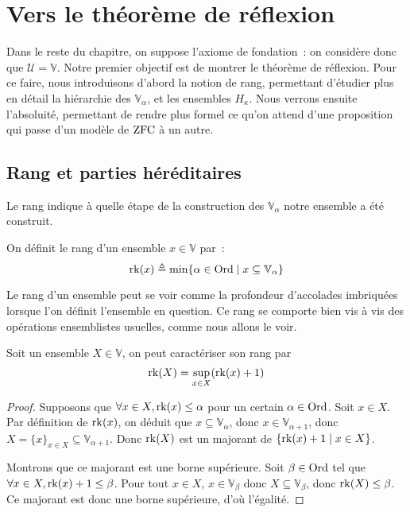 \section{Vers le théorème de réflexion}

Dans le reste du chapitre, on suppose l'axiome de fondation~: on considère donc
que $\mathcal U = \mathbb V$. Notre premier objectif est de montrer le théorème
de réflexion. Pour ce faire, nous introduisons d'abord la notion de rang,
permettant d'étudier plus en détail la hiérarchie des $\mathbb V_\alpha$, et les
ensembles $H_\kappa$. Nous verrons ensuite l'absoluité, permettant de rendre plus
formel ce qu'on attend d'une proposition qui passe d'un modèle de $\operatorname{ZFC}$ à un
autre.

\subsection{Rang et parties héréditaires}

Le rang indique à quelle étape de la construction des $\mathbb V_\alpha$ notre
ensemble a été construit.

\begin{definition}[Rang]
  On définit le rang d'un ensemble $x\in\mathbb V$ par~:
  \[\operatorname{rk}(x) \triangleq \min \{\alpha \in \operatorname{Ord}\mid x\subseteq \mathbb V_\alpha\}\]
\end{definition}

Le rang d'un ensemble peut se voir comme la profondeur d'accolades imbriquées
lorsque l'on définit l'ensemble en question. Ce rang se comporte bien vis à vis
des opérations ensemblistes usuelles, comme nous allons le voir.

\begin{proposition}\label{prop.cara.rk}
  Soit un ensemble $X\in\mathbb V$, on peut caractériser son rang par
  \[\operatorname{rk}(X) = \sup_{x \in X} (\operatorname{rk}(x) + 1)\]
\end{proposition}

\begin{proof}
  Supposons que $\forall x \in X, \operatorname{rk}(x) \leq \alpha$ pour un certain
  $\alpha\in\operatorname{Ord}$. Soit $x\in X$. Par définition de $\operatorname{rk}(x)$, on déduit que
  $x\subseteq \mathbb V_\alpha$, donc $x\in \mathbb V_{\alpha + 1}$, donc
  $X = \{x\}_{x\in X} \subseteq \mathbb V_{\alpha + 1}$. Donc $\operatorname{rk}(X)$ est
  un majorant de $\{\operatorname{rk}(x) + 1 \mid x \in X\}$.

  Montrons que ce majorant est une borne supérieure. Soit $\beta\in\operatorname{Ord}$ tel que
  $\forall x \in X, \operatorname{rk}(x) + 1 \leq \beta$. Pour tout
  $x\in X$, $x\in \mathbb V_\beta$ donc $X\subseteq \mathbb V_\beta$, donc
  $\operatorname{rk}(X) \leq \beta$. Ce majorant est donc une borne supérieure, d'où
  l'égalité.
\end{proof}

